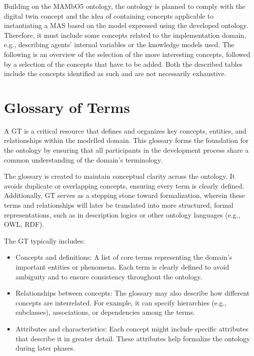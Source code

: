 Building on the MAMbO5 ontology, the \magoontologyname ontology is planned to comply with the digital twin concept and the idea of containing concepts applicable to instantiating a \ac{MAS} based on the model expressed using the developed ontology. Therefore, it must include some concepts related to the implementation domain, e.g., describing agents' internal variables or the knowledge models used. The following is an overview of the selection of the more interesting concepts, followed by a selection of the concepts that have to be added. Both the described tables include the concepts identified as such and are not necessarily exhaustive.


\section{Glossary of Terms}\label{sec: Glossary of Terms}

A \ac{GT} is a critical resource that defines and organizes key concepts, entities, and relationships within the modelled domain. This glossary forms the foundation for the ontology by ensuring that all participants in the development process share a common understanding of the domain's terminology. 

The glossary is created to maintain conceptual clarity across the ontology. It avoids duplicate or overlapping concepts, ensuring every term is clearly defined. Additionally, \ac{GT} serves as a stepping stone toward formalization, wherein these terms and relationships will later be translated into more structured, formal representations, such as in description logics or other ontology languages (e.g., OWL, RDF).

The \ac{GT} typically includes:

\begin{itemize}
    \item Concepts and definitions: A list of core terms representing the domain's important entities or phenomena. Each term is clearly defined to avoid ambiguity and to ensure consistency throughout the ontology.

    \item Relationships between concepts: The glossary may also describe how different concepts are interrelated. For example, it can specify hierarchies (e.g., subclasses), associations, or dependencies among the terms.

    \item Attributes and characteristics: Each concept might include specific attributes that describe it in greater detail. These attributes help formalize the ontology during later phases.
\end{itemize}


